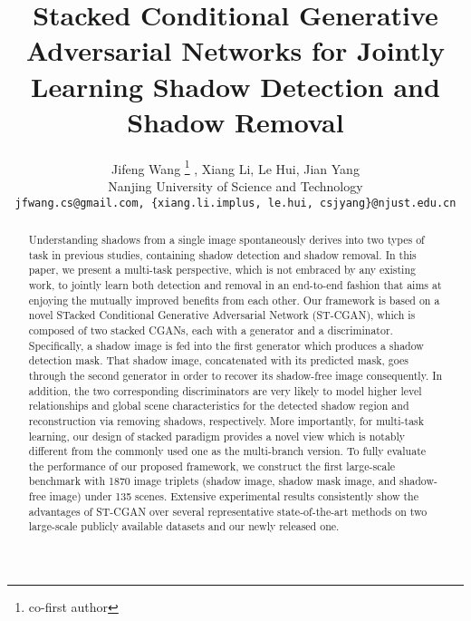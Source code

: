 \documentclass[10pt,twocolumn,letterpaper]{article}
\begin{document}
\title{Stacked Conditional Generative Adversarial Networks for Jointly Learning Shadow Detection and Shadow Removal}
\author{Jifeng Wang \thanks{{co-first author}}
	, Xiang Li, Le Hui, Jian Yang\\
	Nanjing University of Science and Technology\\
	{\tt\small jfwang.cs@gmail.com, \{xiang.li.implus, le.hui, csjyang\}@njust.edu.cn}
}

\iffalse
\author{First Author\\
Institution1\\
Institution1 address\\
{\tt\small firstauthor@i1.org}
\and
Second Author\\
Institution2\\
First line of institution2 address\\
{\tt\small secondauthor@i2.org}
}
\fi
\maketitle


\begin{abstract}
   Understanding shadows from a single image spontaneously derives into two types of task in previous studies, containing shadow detection and shadow removal. In this paper, we present a multi-task perspective, which is not embraced by any existing work, to jointly learn both detection and removal in an end-to-end fashion that aims at enjoying the mutually improved benefits from each other. Our framework is based on a novel STacked Conditional Generative Adversarial Network (ST-CGAN), which is composed of two stacked CGANs, each with a generator and a discriminator. Specifically, a shadow image is fed into the first generator which produces a shadow detection mask. That shadow image, concatenated with its predicted mask, goes through the second generator in order to recover its shadow-free image consequently. In addition, the two corresponding discriminators are very likely to model higher level relationships and global scene characteristics for the detected shadow region and reconstruction via removing shadows, respectively. More importantly, for multi-task learning, our design of stacked paradigm provides a novel view which is notably different from the commonly used one as the multi-branch version. To fully evaluate the performance of our proposed framework, we construct the first large-scale benchmark with 1870 image triplets (shadow image, shadow mask image, and shadow-free image) under 135 scenes. Extensive experimental results consistently show the advantages of ST-CGAN over several representative state-of-the-art methods on two large-scale publicly available datasets and our newly released one.
\end{abstract}
\end{document}
